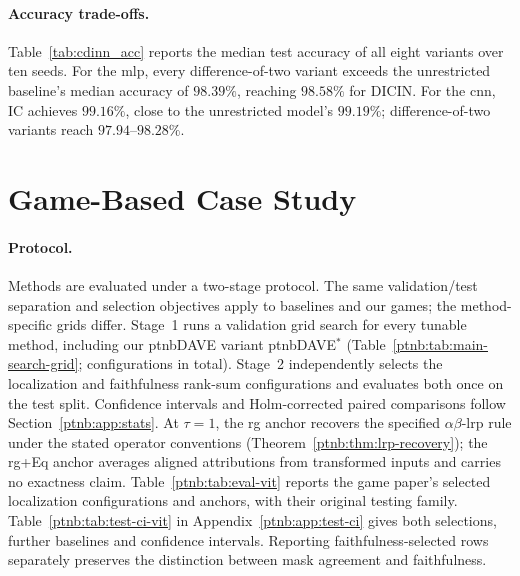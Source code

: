 \paragraph{Accuracy trade-offs.}\label{subsec:dcinn_accuracy}

Table~\ref{tab:cdinn_acc} reports the median test accuracy of all eight variants over ten seeds. For the \ac{mlp}, every difference-of-two variant exceeds the unrestricted baseline's median accuracy of $98.39\%$, reaching $98.58\%$ for DICIN. For the \ac{cnn}, IC achieves $99.16\%$, close to the unrestricted model's $99.19\%$; difference-of-two variants reach $97.94$--$98.28\%$.

\section{Game-Based Case Study}\label{sec:results_vit}\label{sec:saliency_results}\label{ptnb:sec:experiments}\label{ptnb:sec:case-study}



\paragraph{Protocol.}
Methods are evaluated under a two-stage protocol. The same validation/test separation and selection objectives apply to baselines and our games; the method-specific grids differ. Stage~1 runs a validation grid search for every tunable method, including our \acs{ptnbDAVE} variant \acs{ptnbDAVE}$^{*}$ (Table~\ref{ptnb:tab:main-search-grid}; \nValGrid{} configurations in total). Stage~2 independently selects the localization and faithfulness rank-sum configurations and evaluates both once on the test split. Confidence intervals and Holm-corrected paired comparisons follow Section~\ref{ptnb:app:stats}. At $\tau=1$, the \ac{rg} anchor recovers the specified $\alpha\beta$-\ac{lrp} rule under the stated operator conventions (Theorem~\ref{ptnb:thm:lrp-recovery}); the \ac{rg}+Eq anchor averages aligned attributions from transformed inputs and carries no exactness claim. Table~\ref{ptnb:tab:eval-vit} reports the game paper's selected localization configurations and anchors, with their original testing family. Table~\ref{ptnb:tab:test-ci-vit} in Appendix~\ref{ptnb:app:test-ci} gives both selections, further baselines and confidence intervals. Reporting faithfulness-selected rows separately preserves the distinction between mask agreement and faithfulness.




